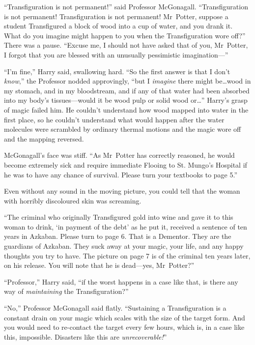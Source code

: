 “Transfiguration is not permanent!” said Professor McGonagall. “Transfiguration is not permanent! Transfiguration is not permanent! Mr~Potter, suppose a student Transfigured a block of wood into a cup of water, and you drank it. What do you imagine might happen to you when the Transfiguration wore off?” There was a pause. “Excuse me, I should not have asked that of you, Mr~Potter, I forgot that you are blessed with an unusually pessimistic imagination—”

“I’m fine,” Harry said, swallowing hard. “So the first answer is that I don’t \emph{know},” the Professor nodded approvingly, “but I \emph{imagine} there might be…wood in my stomach, and in my bloodstream, and if any of that water had been absorbed into my body’s tissues—would it be wood pulp or solid wood or…” Harry’s grasp of magic failed him. He couldn’t understand how wood mapped into water in the first place, so he couldn’t understand what would happen after the water molecules were scrambled by ordinary thermal motions and the magic wore off and the mapping reversed.

McGonagall’s face was stiff. “As Mr~Potter has correctly reasoned, he would become extremely sick and require immediate Flooing to St. Mungo’s Hospital if he was to have any chance of survival. Please turn your textbooks to page 5.”

Even without any sound in the moving picture, you could tell that the woman with horribly discoloured skin was screaming.

“The criminal who originally Transfigured gold into wine and gave it to this woman to drink, ‘in payment of the debt’ as he put it, received a sentence of ten years in Azkaban. Please turn to page 6. That is a Dementor. They are the guardians of Azkaban. They suck away at your magic, your life, and any happy thoughts you try to have. The picture on page 7 is of the criminal ten years later, on his release. You will note that he is dead—yes, Mr~Potter?”

“Professor,” Harry said, “if the worst happens in a case like that, is there any way of \emph{maintaining} the Transfiguration?”

“No,” Professor McGonagall said flatly. “Sustaining a Transfiguration is a constant drain on your magic which scales with the size of the target form. And you would need to re-contact the target every few hours, which is, in a case like this, impossible. Disasters like this are \emph{unrecoverable!}”


